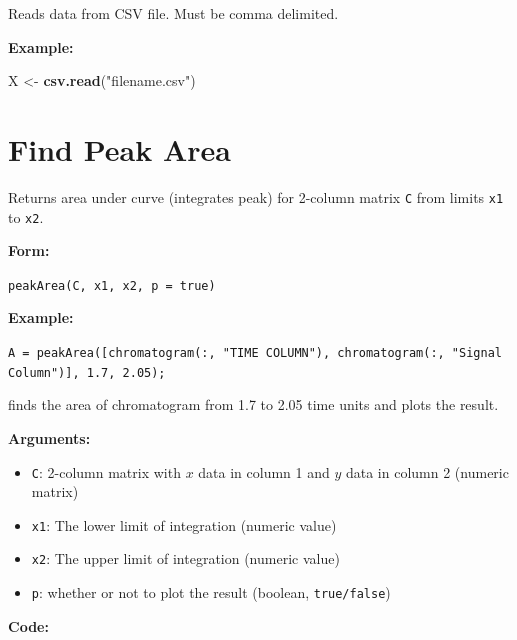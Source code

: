 \documentclass[]{tufte-book}
\newenvironment{Shaded}{}{}
\newcommand{\KeywordTok}[1]{\textcolor[rgb]{0.00,0.44,0.13}{\textbf{#1}}}
\newcommand{\NormalTok}[1]{#1}
\newcommand{\StringTok}[1]{\textcolor[rgb]{0.25,0.44,0.63}{#1}}
\begin{document}
Reads data from CSV file. Must be comma delimited.

\textbf{Example:}

\begin{Shaded}
\begin{Highlighting}[]
\NormalTok{X <-}\StringTok{ }\KeywordTok{csv.read}\NormalTok{(}\StringTok{"filename.csv"}\NormalTok{)}
\end{Highlighting}
\end{Shaded}

\hypertarget{find-peak-area}{%
\section*{Find Peak Area}\label{find-peak-area}}

Returns area under curve (integrates peak) for 2-column matrix \texttt{C} from limits \texttt{x1} to \texttt{x2}.

\textbf{Form:}

\texttt{peakArea(C,\ x1,\ x2,\ p\ =\ true)}

\textbf{Example:}

\texttt{A\ =\ peakArea({[}chromatogram(:,\ "TIME\ COLUMN"),\ chromatogram(:,\ "Signal\ Column"){]},\ 1.7,\ 2.05);}

finds the area of chromatogram from 1.7 to 2.05 time units and plots the result.

\textbf{Arguments:}

\begin{itemize}
\item
  \texttt{C}: 2-column matrix with \(x\) data in column 1 and \(y\) data in column 2 (numeric matrix)
\item
  \texttt{x1}: The lower limit of integration (numeric value)
\item
  \texttt{x2}: The upper limit of integration (numeric value)
\item
  \texttt{p}: whether or not to plot the result (boolean, \texttt{true/false})
\end{itemize}

\textbf{Code:}
\end{document}

